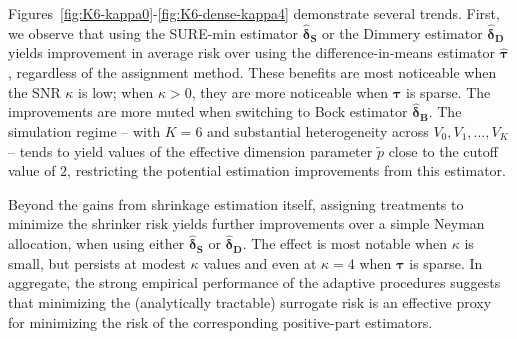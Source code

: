 \documentclass{article}
\newcommand{\bstau}{\boldsymbol \tau}
\newcommand{\hbstau}{\boldsymbol{\hat \tau}}
\newcommand{\bsdeltad}{\boldsymbol{\hat \delta_{\textbf{D}}}}
\newcommand{\bsdeltb}{\boldsymbol {\hat \delta_B}}
\newcommand{\bsdelts}{\boldsymbol {\hat \delta_S}}
\begin{document}

Figures~\ref{fig:K6-kappa0}-\ref{fig:K6-dense-kappa4} demonstrate several trends. First, we observe that using the SURE-min estimator $\bsdelts$ or the Dimmery estimator $\bsdeltad$ yields improvement in average risk over using the difference-in-means estimator $\hbstau$, regardless of the assignment method. These benefits are most noticeable when the SNR $\kappa$ is low; when $\kappa > 0$, they are more noticeable when $\bstau$ is sparse. The improvements are more muted when switching to Bock estimator $\bsdeltb$. The simulation regime -- with $K = 6$ and substantial heterogeneity across $V_0, V_1, \dots, V_K$ -- tends to yield values of the effective dimension parameter $\tilde p$ close to the cutoff value of $2$, restricting the potential estimation improvements from this estimator. 

Beyond the gains from shrinkage estimation itself, assigning treatments to minimize the shrinker risk yields further improvements
over a simple Neyman allocation, when using either $\bsdelts$ or $\bsdeltad$. The effect is most notable when $\kappa$ is small, but persists at modest $\kappa$ values and even at $\kappa = 4$ when $\bstau$ is sparse. In aggregate, the strong empirical performance of the adaptive procedures suggests that minimizing the (analytically tractable) surrogate risk is an effective proxy for minimizing the risk of the corresponding positive-part estimators. 
\end{document}
